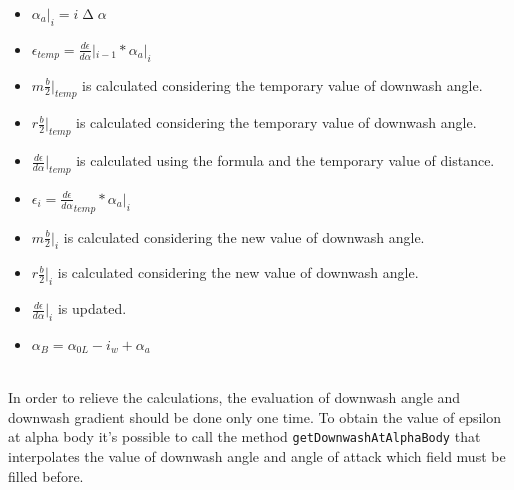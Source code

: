 \begin{enumerate}
\begin{itemize}
\item $\alpha_a|_i = i \upDelta \alpha$ 
\item $\epsilon_{temp}= \frac{d\epsilon}{d\alpha} |_{i-1} *  \alpha_a |_i $%
\item  $m  \frac{b}{2}| _{temp} $  is calculated considering the temporary value of downwash angle.
\item  $r  \frac{b}{2}| _{temp} $  is calculated considering the temporary value of downwash angle.
\item $\frac{d\epsilon}{d\alpha}|_{temp}$  is calculated using the formula and the temporary value of distance.
\item $\epsilon_{i}=  \frac{d\epsilon}{d\alpha}_{temp} *  \alpha_a |_i $ 
\item  $m  \frac{b}{2}| _{i} $  is calculated considering the new value of downwash angle.
\item  $r \frac{b}{2}| _{i} $  is calculated considering the new value of downwash angle.
\item $\frac{d\epsilon}{d\alpha}|_{i}$  is updated.
\item $\alpha_B =\alpha_{0L} - i_w + \alpha_a $ 
\end{itemize}

\end{enumerate}

\noindent \\
In order to relieve the calculations, the evaluation of downwash angle and downwash gradient should be done only one time. To obtain the value of epsilon at alpha body it's possible to call the method  \texttt{getDownwashAtAlphaBody} that interpolates the value of downwash angle and angle of attack which field must be filled before.\\ 





